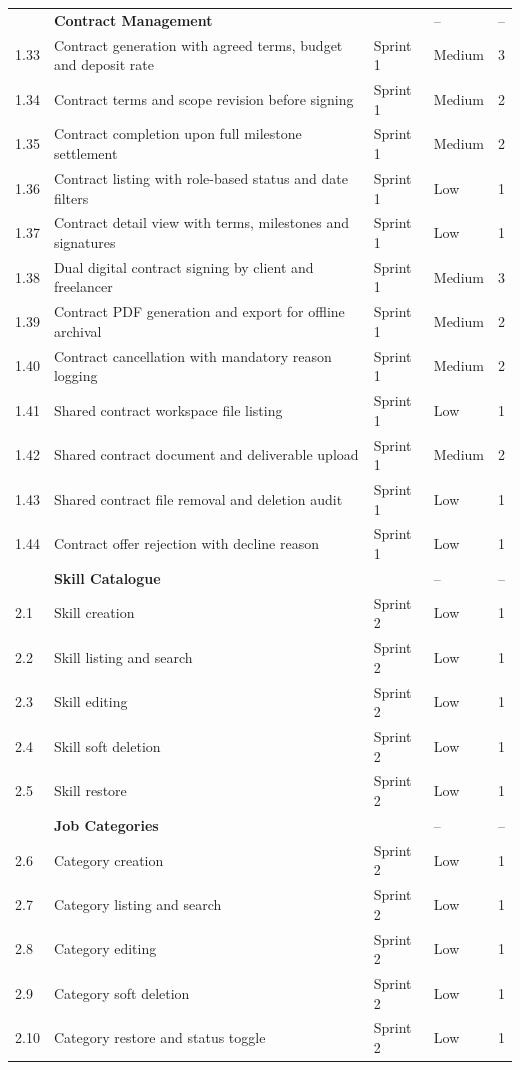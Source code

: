 \begin{longtable}{|
C{1.0cm}|
L{6.9cm}|
C{1.8cm}|
C{2.1cm}|
C{2.3cm}|}
 & \textbf{Contract Management} &  & -- & -- \\*
1.33 & Contract generation with agreed terms, budget and deposit rate & Sprint 1 & Medium & 3 \\
1.34 & Contract terms and scope revision before signing & Sprint 1 & Medium & 2 \\
1.35 & Contract completion upon full milestone settlement & Sprint 1 & Medium & 2 \\
1.36 & Contract listing with role-based status and date filters & Sprint 1 & Low & 1 \\
1.37 & Contract detail view with terms, milestones and signatures & Sprint 1 & Low & 1 \\
1.38 & Dual digital contract signing by client and freelancer & Sprint 1 & Medium & 3 \\
1.39 & Contract PDF generation and export for offline archival & Sprint 1 & Medium & 2 \\
1.40 & Contract cancellation with mandatory reason logging & Sprint 1 & Medium & 2 \\
1.41 & Shared contract workspace file listing & Sprint 1 & Low & 1 \\
1.42 & Shared contract document and deliverable upload & Sprint 1 & Medium & 2 \\
1.43 & Shared contract file removal and deletion audit & Sprint 1 & Low & 1 \\
1.44 & Contract offer rejection with decline reason & Sprint 1 & Low & 1 \\
\hline


 & \textbf{Skill Catalogue} &  & -- & -- \\
2.1 & Skill creation & Sprint 2 & Low & 1 \\
2.2 & Skill listing and search & Sprint 2 & Low & 1 \\
2.3 & Skill editing & Sprint 2 & Low & 1 \\
2.4 & Skill soft deletion & Sprint 2 & Low & 1 \\
2.5 & Skill restore & Sprint 2 & Low & 1 \\
\hline

 & \textbf{Job Categories} &  & -- & -- \\
2.6 & Category creation & Sprint 2 & Low & 1 \\
2.7 & Category listing and search & Sprint 2 & Low & 1 \\
2.8 & Category editing & Sprint 2 & Low & 1 \\
2.9 & Category soft deletion & Sprint 2 & Low & 1 \\
2.10 & Category restore and status toggle & Sprint 2 & Low & 1 \\
\hline


\end{longtable}
